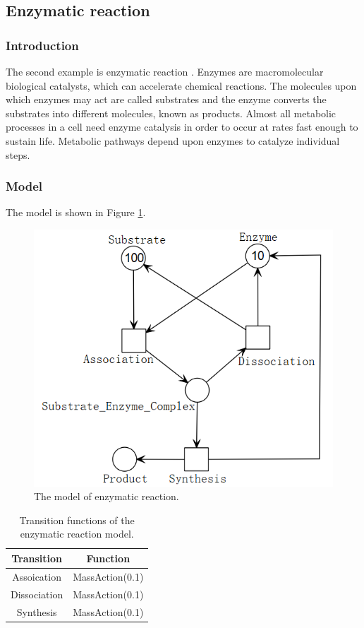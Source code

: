 \documentclass[journal,a4paper,onecolumn]{article}
\begin{document}
\clearpage
\subsection{Enzymatic reaction}

\subsubsection{Introduction}
The second example is enzymatic reaction \cite{BHM11}. Enzymes are macromolecular biological catalysts, which can accelerate chemical reactions. The molecules upon which enzymes may act are called substrates and the enzyme converts the substrates into different molecules, known as products. Almost all metabolic processes in a cell need enzyme catalysis in order to occur at rates fast enough to sustain life. Metabolic pathways depend upon enzymes to catalyze individual steps. 

\subsubsection{Model}
The model is shown in Figure \ref{fig:The model of enzyme}.

\begin{figure}[!hbt]
	\begin{center}
		\includegraphics[width=0.8\columnwidth]{fig25}
		\caption{The model of enzymatic reaction.}
		\label{fig:The model of enzyme}
	\end{center}
\end{figure}

\begin{table}[!hbt]
	\begin{center}
		\caption{Transition functions of the enzymatic reaction model.}
		\label{Transition functions of enzyme}
		\begin{tabular}{|c|c|}
			\hline
			Transition&Function\\
			\hline
			Assoication&MassAction(0.1)\\
			\hline
			Dissociation&MassAction(0.1)\\
			\hline
			Synthesis&MassAction(0.1)\\
			\hline
		\end{tabular}
	\end{center}
\end{table}
\end{document}
